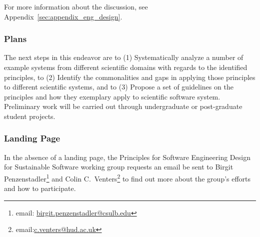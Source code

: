 For more information about the discussion, see Appendix~\ref{sec:appendix_eng_design}.

\subsubsection{Plans}

The next steps in this endeavor are to (1) Systematically analyze a number of
example systems from different scientific domains with regards to the identified
principles, to (2) Identify the commonalities and gaps in applying those
principles to different scientific systems, and to (3) Propose a set of
guidelines on the principles and how they exemplary apply to scientific software
system. Preliminary work will be carried out through undergraduate or
post-graduate student projects.

\subsubsection{Landing Page}

In the absence of a landing page, the Principles for Software Engineering Design
for Sustainable Software working group requests an email be sent to Birgit
Penzenstadler\footnote{email:
\href{mailto:birgit.penzenstadler@csulb.edu}{birgit.penzenstadler@csulb.edu}}
and Colin C.\
Venters\footnote{email:\href{mailto:c.venters@hud.ac.uk}{c.venters@hud.ac.uk}}
to find out more about the group's efforts and how to participate.
